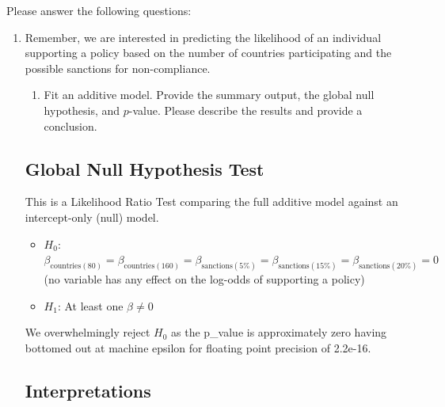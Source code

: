 \documentclass[12pt,letterpaper]{article}
\begin{document}
\newpage
\noindent Please answer the following questions:

\begin{enumerate}
	\item
	Remember, we are interested in predicting the likelihood of an individual supporting a policy based on the number of countries participating and the possible sanctions for non-compliance.
	\begin{enumerate}
		\item [] Fit an additive model. Provide the summary output, the global null hypothesis, and $p$-value. Please describe the results and provide a conclusion.
		

	\end{enumerate}
	

 
\vspace{.5cm}	


\subsection*{Global Null Hypothesis Test}

This is a Likelihood Ratio Test comparing the full additive model against an intercept-only (null) model.

\begin{itemize}
	\item $H_0$: $\beta_{\text{countries}(80)} = \beta_{\text{countries}(160)} = \beta_{\text{sanctions}(5\%)} = \beta_{\text{sanctions}(15\%)} = \beta_{\text{sanctions}(20\%)} = 0$ \\ (no variable has any effect on the log-odds of supporting a policy)
	\item $H_1$: At least one $\beta \neq 0$
\end{itemize}

 
\vspace{.5cm}

\vspace*{.5cm}
We overwhelmingly reject $H_0$ as the p\_value is approximately zero having bottomed out at machine epsilon for floating point precision of 2.2e-16.

\subsection*{Interpretations}


\end{enumerate}
\end{document}
